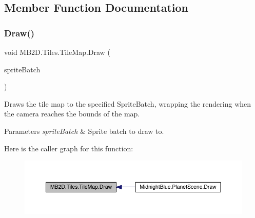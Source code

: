 \subsection{Member Function Documentation}
\hypertarget{class_m_b2_d_1_1_tiles_1_1_tile_map_aa4c7f815bf7b9fc53a4dcf1a2b0df175}{}\label{class_m_b2_d_1_1_tiles_1_1_tile_map_aa4c7f815bf7b9fc53a4dcf1a2b0df175} 
\subsubsection{\texorpdfstring{Draw()}{Draw()}}
{\footnotesize\ttfamily void M\+B2\+D.\+Tiles.\+Tile\+Map.\+Draw (\begin{DoxyParamCaption}\item[{Sprite\+Batch}]{sprite\+Batch }\end{DoxyParamCaption})\hspace{0.3cm}{\ttfamily [inline]}}



Draws the tile map to the specified Sprite\+Batch, wrapping the rendering when the camera reaches the bounds of the map. 


\begin{DoxyParams}{Parameters}
{\em sprite\+Batch} & Sprite batch to draw to.\\
\hline
\end{DoxyParams}
Here is the caller graph for this function\+:
\nopagebreak
\begin{figure}[H]
\begin{center}
\leavevmode
\includegraphics[width=350pt]{class_m_b2_d_1_1_tiles_1_1_tile_map_aa4c7f815bf7b9fc53a4dcf1a2b0df175_icgraph}
\end{center}
\end{figure}
\hypertarget{class_m_b2_d_1_1_tiles_1_1_tile_map_acc786702f8dfb76227fcd76ce0b20510}{}\label{class_m_b2_d_1_1_tiles_1_1_tile_map_acc786702f8dfb76227fcd76ce0b20510} 
